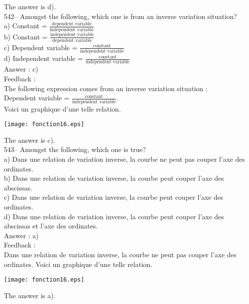 ﻿\documentclass[letterpaper, 12pt]{article}
\begin{document}
The answer is d).\\


542-- Amongst the following, which one is from an inverse variation situation?\\[2mm]
a) Constant = $\frac{\textrm{dependent variable}}{\textrm{independent variable}}$\\[2mm]
b) Constant = $\frac{\textrm{independent variable}}{\textrm{dependent variable}}$\\[2mm]
c) Dependent variable = $\frac{\textrm{constant}}{\textrm{independent variable}}$\\[2mm]
d) Independent variable = $\frac{\textrm{constant}}{\textrm{independent variable}}$\\

Answer : c)\\

Feedback : \\
The following expression comes from an inverse variation situation :\\[2mm]
Dependent variable = $\frac{\textrm{constant}}{\textrm{independent variable}}$.\\[2mm]
Voici un graphique d'une telle relation.
    \begin{center}
    \texttt{[image: fonction16.eps]}
    \end{center}
The answer is c).\\

543-- Amongst the following, which one is true?\\
a) Dans une relation de variation inverse, la courbe ne peut pas couper
l'axe des ordinates.\\
b) Dans une relation de variation inverse, la courbe peut couper l'axe des
abscissas.\\
c) Dans une relation de variation inverse, la courbe peut couper l'axe des
ordinates.\\
d) Dans une relation de variation inverse, la courbe peut couper l'axe des
abscissas et l'axe des ordinates.\\

Answer : a)\\

Feedback : \\
Dans une relation de variation inverse, la courbe ne peut pas couper
l'axe des ordinates. Voici un graphique d'une telle relation.
    \begin{center}
    \texttt{[image: fonction16.eps]}
    \end{center}
The answer is a).\\
\end{document}
